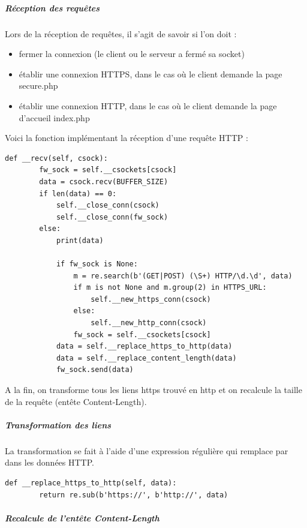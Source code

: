 \subparagraph{Réception des requêtes \\}

Lors de la réception de requêtes, il s'agit de savoir si l'on doit :

\begin{itemize}
\item fermer la connexion (le client ou le serveur a fermé sa socket)
\item établir une connexion HTTPS, dans le cas où le client demande la page secure.php
\item établir une connexion HTTP, dans le cas où le client demande la page d'accueil index.php
\end{itemize}

Voici la fonction implémentant la réception d'une requête HTTP :

\begin{verbatim}
def __recv(self, csock):
        fw_sock = self.__csockets[csock]
        data = csock.recv(BUFFER_SIZE)
        if len(data) == 0:
            self.__close_conn(csock)
            self.__close_conn(fw_sock)
        else:
            print(data)

            if fw_sock is None:
                m = re.search(b'(GET|POST) (\S+) HTTP/\d.\d', data)
                if m is not None and m.group(2) in HTTPS_URL:
                    self.__new_https_conn(csock)
                else:
                    self.__new_http_conn(csock)
                fw_sock = self.__csockets[csock]
            data = self.__replace_https_to_http(data)
            data = self.__replace_content_length(data)
            fw_sock.send(data)
\end{verbatim}

A la fin, on transforme tous les liens https trouvé en http et on recalcule la taille de la requête (entête Content-Length).

\subparagraph{Transformation des liens \\}

La transformation se fait à l'aide d'une expression régulière qui remplace  par  dans les données HTTP.

\begin{verbatim}
def __replace_https_to_http(self, data):
        return re.sub(b'https://', b'http://', data)
\end{verbatim}

\subparagraph{Recalcule de l'entête Content-Length \\}

